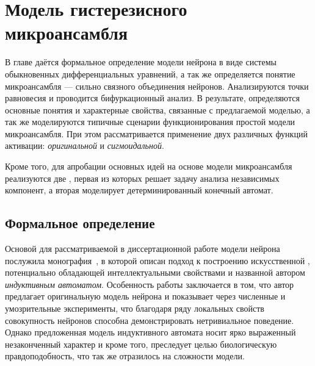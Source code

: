 \chapter{Модель гистерезисного микроансамбля} \label{chapter:neuron}

В главе даётся формальное определение модели нейрона в виде системы обыкновенных дифференциальных уравнений, а так же определяется понятие микроансамбля --- сильно связного объединения нейронов. Анализируются точки равновесия и проводится бифуркационный анализ. В результате, определяются основные понятия и характерные свойства, связанные с предлагаемой моделью, а так же моделируются типичные сценарии функционирования простой модели микроансамбля. При этом рассматривается применение двух различных функций активации: \textit{оригинальной} и \textit{сигмоидальной}. 

Кроме того, для апробации основных идей на основе модели микроансамбля реализуются две , первая из которых решает задачу анализа независимых компонент, а вторая моделирует детерминированный конечный автомат. 


\section{Формальное определение} \label{section:neuron_model}

Основой для рассматриваемой в диссертационной работе модели нейрона послужила монография~\cite{EmelyanovYaroslavsky1990}, в которой описан подход к построению искусственной , потенциально обладающей интеллектуальными свойствами и названной автором \textit{индуктивным автоматом}. Особенность работы заключается в том, что автор предлагает оригинальную модель нейрона и показывает через численные и умозрительные эксперименты, что благодаря ряду локальных свойств совокупность нейронов способна демонстрировать нетривиальное поведение. Однако предложенная модель индуктивного автомата носит ярко выраженный незаконченный характер и кроме того, преследует целью биологическую правдоподобность, что так же отразилось на сложности модели.

